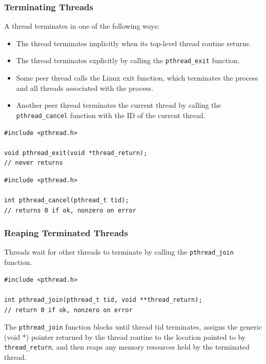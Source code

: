 \documentclass[11pt]{article}
\begin{document}
\subsubsection{Terminating Threads}
\label{sec:orgf3bcb07}
A thread terminates in one of the following ways:\\
\begin{itemize}
\item The thread terminates implicitly when its top-level thread routine returns.\\
\item The thread terminates explicitly by calling the \texttt{pthread\_exit} function.\\
\item Some peer thread calls the Linux exit function, which terminates the process and all threads associated with the process.\\
\item Another peer thread terminates the current thread by calling the \texttt{pthread\_cancel} function with the ID of the current thread.\\
\end{itemize}


\begin{verbatim}
#include <pthread.h>

void pthread_exit(void *thread_return);
// never returns
\end{verbatim}

\begin{verbatim}
#include <pthread.h>

int pthread_cancel(pthread_t tid);
// returns 0 if ok, nonzero on error
\end{verbatim}


\subsubsection{Reaping Terminated Threads}
\label{sec:orgc128f87}
Threads wait for other threads to terminate by calling the \texttt{pthread\_join} function.\\

\begin{verbatim}
#include <pthread.h>

int pthread_join(pthread_t tid, void **thread_return);
// return 0 if ok, nonzero on error
\end{verbatim}

The \texttt{pthread\_join} function blocks until thread tid terminates, assigns the generic (void *) pointer returned by the thread routine to the location pointed to by \texttt{thread\_return}, and then reaps any memory resources held by the terminated thread.\\
\end{document}
